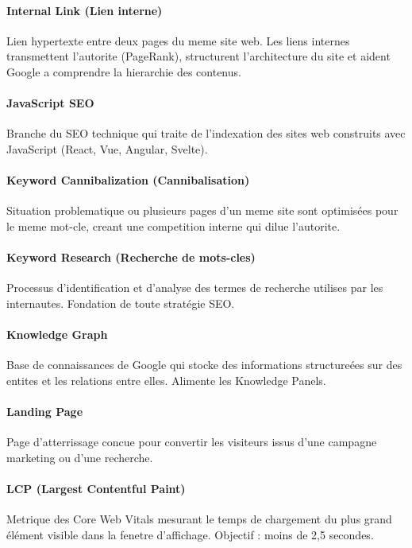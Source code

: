 \paragraph*{Internal Link (Lien interne)}
Lien hypertexte entre deux pages du meme site web. Les liens internes transmettent l'autorite (PageRank), structurent l'architecture du site et aident Google a comprendre la hierarchie des contenus.

\paragraph*{JavaScript SEO}
Branche du SEO technique qui traite de l'indexation des sites web construits avec JavaScript (React, Vue, Angular, Svelte).

\paragraph*{Keyword Cannibalization (Cannibalisation)}
Situation problematique ou plusieurs pages d'un meme site sont optimisées pour le meme mot-cle, creant une competition interne qui dilue l'autorite.

\paragraph*{Keyword Research (Recherche de mots-cles)}
Processus d'identification et d'analyse des termes de recherche utilises par les internautes. Fondation de toute stratégie SEO.

\paragraph*{Knowledge Graph}
Base de connaissances de Google qui stocke des informations structureées sur des entites et les relations entre elles. Alimente les Knowledge Panels.

\paragraph*{Landing Page}
Page d'atterrissage concue pour convertir les visiteurs issus d'une campagne marketing ou d'une recherche.

\paragraph*{LCP (Largest Contentful Paint)}
Metrique des Core Web Vitals mesurant le temps de chargement du plus grand élément visible dans la fenetre d'affichage. Objectif : moins de 2,5 secondes.

